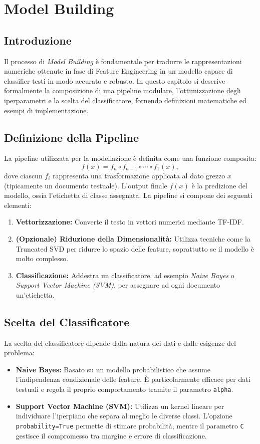 \chapter{Model Building}

\section{Introduzione}
Il processo di \emph{Model Building} è fondamentale per tradurre le rappresentazioni numeriche ottenute in fase di Feature Engineering in un modello capace di classifier testi in modo accurato e robusto. In questo capitolo si descrive formalmente la composizione di una pipeline modulare, l'ottimizzazione degli iperparametri e la scelta del classificatore, fornendo definizioni matematiche ed esempi di implementazione.

\section{Definizione della Pipeline}
La pipeline utilizzata per la modellazione è definita come una funzione composita:
\[
f(x) = f_n \circ f_{n-1} \circ \cdots \circ f_1(x),
\]
dove ciascun \( f_i \) rappresenta una trasformazione applicata al dato grezzo \( x \) (tipicamente un documento testuale). L'output finale \( f(x) \) è la predizione del modello, ossia l'etichetta di classe assegnata.
La pipeline si compone dei seguenti elementi:
\begin{enumerate}
  \item \textbf{Vettorizzazione:} Converte il testo in vettori numerici mediante TF-IDF.
  \item \textbf{(Opzionale) Riduzione della Dimensionalità:} Utilizza tecniche come la Truncated SVD per ridurre lo spazio delle feature, soprattutto se il modello è molto complesso.
  \item \textbf{Classificazione:} Addestra un classificatore, ad esempio \emph{Naive Bayes} o \emph{Support Vector Machine (SVM)}, per assegnare ad ogni documento un'etichetta.
\end{enumerate}

\section{Scelta del Classificatore}
La scelta del classificatore dipende dalla natura dei dati e dalle esigenze del problema:
\begin{itemize}
  \item \textbf{Naive Bayes:} Basato su un modello probabilistico che assume l'indipendenza condizionale delle feature. È particolarmente efficace per dati testuali e regola il proprio comportamento tramite il parametro \texttt{alpha}.
  \item \textbf{Support Vector Machine (SVM):} Utilizza un kernel lineare per individuare l'iperpiano che separa al meglio le diverse classi. L'opzione \texttt{probability=True} permette di stimare probabilità, mentre il parametro \texttt{C} gestisce il compromesso tra margine e errore di classificazione.
\end{itemize}

